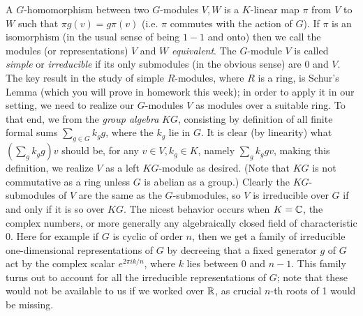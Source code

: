  A $G$-homomorphism between two $G$-modules $V,W$ is a $K$-linear map $\pi$ from $V$ to $W$ such that $\pi g(v) = g\pi(v)$ (i.e. $\pi$ commutes with the action of $G$).   If $\pi$ is an isomorphism (in the usual sense of being $1-1$ and onto) then we call the modules (or representations) $V$ and $W$ {\sl equivalent}.  The $G$-module $V$ is called {\sl simple} or {\sl irreducible} if its only submodules (in the obvious sense) are 0 and $V$.  The key result in the study of simple $R$-modules, where $R$ is a ring, is Schur's Lemma (which you will prove in homework this week); in order to apply it in our setting, we need to realize our $G$-modules $V$ as modules over a suitable ring.  To that end, we from the {\sl group algebra} $KG$, consisting by definition of all finite formal sums $\sum_{g\in G} k_g g$, where the $k_g$ lie in $G$.  It is clear (by linearity) what
$(\sum_g k_g g)v$ should be, for any $v\in V,k_g\in K$, namely $\sum_g k_g gv$, making this definition, we realize $V$ as a left $KG$-module as desired.  (Note that $KG$ is not commutative as a ring unless $G$ is abelian as a group.)  Clearly the $KG$-submodules of $V$ are the same as the $G$-submodules, so $V$ is irreducible over $G$ if and only if it is so over $KG$.  The nicest behavior occurs when $K=\Bbb C$, the complex numbers, or more generally any algebraically closed field of characteristic 0.  Here for example if $G$ is cyclic of order $n$, then we get a family of irreducible one-dimensional representations of $G$ by decreeing that a fixed generator $g$ of $G$ act by the complex scalar $e^{2\pi ik/n}$, where $k$ lies between 0 and $n-1$.  This family turns out to account for all the irreducible representations of $G$; note that these would not be available to us if we worked over $\Bbb R$, as crucial $n$-th roots of 1 would be missing.